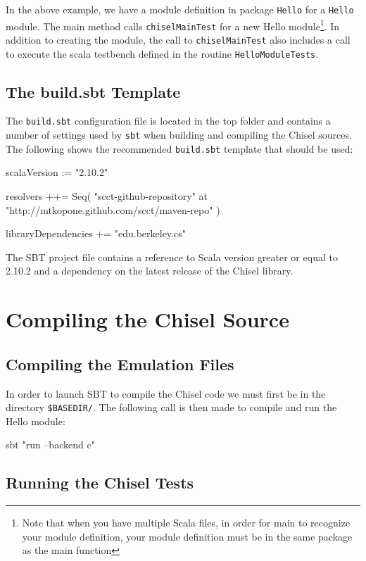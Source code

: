 In the above example, we have a module definition in package \verb+Hello+ for a \verb+Hello+ module. The main method calls \verb+chiselMainTest+ for a new Hello module\footnote{Note that when you have multiple Scala files, in order for main to recognize your module definition, your module definition must be in the same package as the main function}. In addition to creating the module, the call to \verb+chiselMainTest+ also includes a call to execute the scala testbench defined in the routine \verb+HelloModuleTests+.

\subsection{The build.sbt Template}

The \verb+build.sbt+ configuration file is located in the top folder and contains a number of settings used by \verb+sbt+ when building and compiling the Chisel sources.  The following shows the recommended \verb+build.sbt+ template that should be used:

\begin{scala}
scalaVersion := "2.10.2"

resolvers ++= Seq(
  "scct-github-repository" at "http://mtkopone.github.com/scct/maven-repo"
)

libraryDependencies += 
  "edu.berkeley.cs" %
\end{scala}

The SBT project file contains a reference to Scala version greater or equal to 2.10.2 and a dependency on the latest release of the Chisel library.

\section{Compiling the Chisel Source}

\subsection{Compiling the Emulation Files}

In order to launch SBT to compile the Chisel code we must first be in the directory \verb+$BASEDIR/+. The following call is then made to compile and run the Hello module:

\begin{bash}
sbt "run --backend c"
\end{bash}

\subsection{Running the Chisel Tests}

